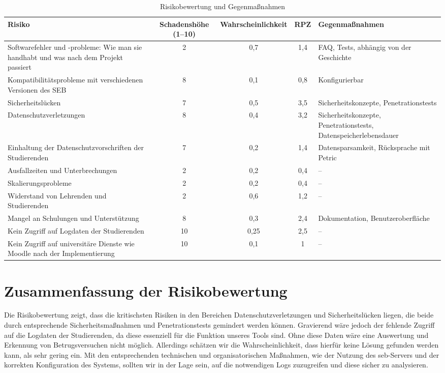 \begin{landscape}
\begin{table}[htbp]
\centering
\begin{tabular}{|p{7cm}|c|c|c|p{6cm}|}
\hline
\textbf{Risiko} & \textbf{Schadenshöhe (1–10)} & \textbf{Wahrscheinlichkeit} & \textbf{RPZ} & \textbf{Gegenmaßnahmen} \\
\hline
Softwarefehler und -probleme: Wie man sie handhabt und was nach dem Projekt passiert & 2 & 0,7 & 1,4 & FAQ, Tests, abhängig von der Geschichte \\
\hline
Kompatibilitätsprobleme mit verschiedenen Versionen des SEB & 8 & 0,1 & 0,8 & Konfigurierbar \\
\hline
Sicherheitslücken & 7 & 0,5 & 3,5 & Sicherheitskonzepte, Penetrationstests \\
\hline
Datenschutzverletzungen & 8 & 0,4 & 3,2 & Sicherheitskonzepte, Penetrationstests, Datenspeicherlebensdauer \\
\hline
Einhaltung der Datenschutzvorschriften der Studierenden & 7 & 0,2 & 1,4 & Datensparsamkeit, Rücksprache mit Petric \\
\hline
Ausfallzeiten und Unterbrechungen & 2 & 0,2 & 0,4 & -- \\
\hline
Skalierungsprobleme & 2 & 0,2 & 0,4 & -- \\
\hline
Widerstand von Lehrenden und Studierenden & 2 & 0,6 & 1,2 & -- \\
\hline
Mangel an Schulungen und Unterstützung & 8 & 0,3 & 2,4 & Dokumentation, Benutzeroberfläche \\
\hline
Kein Zugriff auf Logdaten der Studierenden & 10 & 0,25 & 2,5 & -- \\
\hline
Kein Zugriff auf universitäre Dienste wie Moodle nach der Implementierung & 10 & 0,1 & 1 & -- \\
\hline
\end{tabular}
\caption{Risikobewertung und Gegenmaßnahmen}
\end{table}
\end{landscape}

\section{Zusammenfassung der Risikobewertung}

Die Risikobewertung zeigt, dass die kritischsten Risiken in den Bereichen Datenschutzverletzungen und Sicherheitslücken liegen, die beide durch entsprechende Sicherheitsmaßnahmen und Penetrationstests gemindert werden können. 
Gravierend wäre jedoch der fehlende Zugriff auf die Logdaten der Studierenden, da diese essenziell für die Funktion unseres Tools sind. 
Ohne diese Daten wäre eine Auswertung und Erkennung von Betrugsversuchen nicht möglich. 
Allerdings schätzen wir die Wahrscheinlichkeit, dass hierfür keine Lösung gefunden werden kann, als sehr gering ein. 
Mit den entsprechenden technischen und organisatorischen Maßnahmen, wie der Nutzung des \gls{seb}-Servers und der korrekten Konfiguration des Systems, sollten wir in der Lage sein, auf die notwendigen Logs zuzugreifen und diese sicher zu analysieren.
